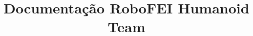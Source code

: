 \documentclass[acronym,symbols]{fei}
\author{}
\title{Documentação RoboFEI Humanoid Team}
\begin{document}
\maketitle

\tableofcontents

\listoffigures
\listoftables
\printglossaries
\listofalgorithms




% 
% 
% 
% 
% 

% 
% 

\printbibliography

\end{document}
